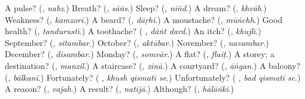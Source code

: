 \begin{tcolorbox}[breakable,colback=teal!4,colframe=teal!35!black,title={Before you move on}]
A pulse? (\textbf{}, \emph{nabz}.) Breath? (\textbf{}, \emph{sāṅs}.) Sleep? (\textbf{}, \emph{nīṅd}.) A dream? (\textbf{}, \emph{khvāb}.) Weakness? (\textbf{}, \emph{kamzorī}.) A beard? (\textbf{}, \emph{dāṛhī}.) A moustache? (\textbf{}, \emph{mūṅchh}.) Good health? (\textbf{}, \emph{tandurustī}.) A toothache? (\textbf{ }, \emph{dāṅt dard}.) An itch? (\textbf{}, \emph{khujlī}.) September? (\textbf{}, \emph{sitambar}.) October? (\textbf{}, \emph{aktūbar}.) November? (\textbf{}, \emph{navambar}.) December? (\textbf{}, \emph{disambar}.) Monday? (\textbf{}, \emph{somvār}.) A flat? (\textbf{}, \emph{flaiṭ}.) A storey; a destination? (\textbf{}, \emph{manzil}.) A staircase? (\textbf{}, \emph{zīnā}.) A courtyard? (\textbf{}, \emph{āṅgan}.) A balcony? (\textbf{}, \emph{bālkanī}.) Fortunately? (\textbf{  }, \emph{khush qismatī se}.) Unfortunately? (\textbf{  }, \emph{bad qismatī se}.) A reason? (\textbf{}, \emph{vajah}.) A result? (\textbf{}, \emph{natījā}.) Although? (\textbf{}, \emph{hālāṅki}.)
\end{tcolorbox}
